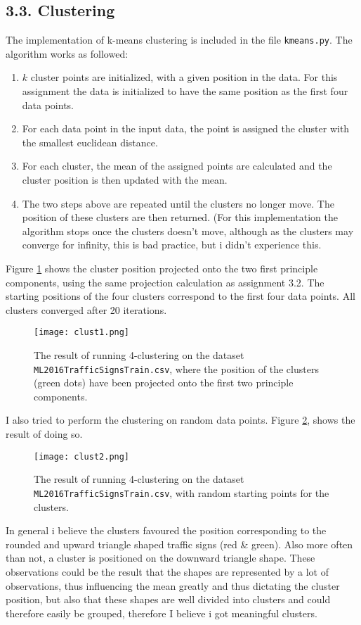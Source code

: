 \documentclass{article}
\begin{document}
\subsection{3.3. Clustering}
The implementation of k-means clustering is included in the file \texttt{kmeans.py}. The algorithm works as followed:
\begin{enumerate}
\item{$k$ cluster points are initialized, with a given position in the data. For this assignment the data is initialized to have the same position as the first four data points.}
\item{For each data point in the input data, the point is assigned the cluster with the smallest euclidean distance.}
\item{For each cluster, the mean of the assigned points are calculated
and the cluster position is then updated with the mean.
}
\item{The two steps above are repeated until the clusters no longer move. The position of these clusters are then returned. (For this implementation the algorithm stops once the clusters doesn't move, although as the clusters may converge for infinity, this is bad practice, but i didn't experience this.}
\end{enumerate}
Figure \ref{fig:clust1} shows the cluster position projected onto the two first principle components, using the same projection calculation as assignment 3.2. The starting positions of the four clusters correspond to the first four data points. All clusters converged after 20 iterations.
\begin{figure}[H]
  \centering
  \texttt{[image: clust1.png]}
  \caption{The result of running 4-clustering on the dataset \texttt{ML2016TrafficSignsTrain.csv}, where the position of the clusters (green dots) have been projected onto the first two principle components.
  }
  \label{fig:clust1}
\end{figure}
I also tried to perform the clustering on random data points. Figure \ref{fig:clust2}, shows the result of doing so.
\begin{figure}[H]
  \centering
  \texttt{[image: clust2.png]}
  \caption{The result of running 4-clustering on the dataset \texttt{ML2016TrafficSignsTrain.csv}, with random starting points for the clusters.
  }
  \label{fig:clust2}
\end{figure}
In general i believe the clusters favoured the position corresponding to the rounded and upward triangle shaped traffic signs (red \& green). Also more often than not, a cluster is positioned on the downward triangle shape.  These observations could be the result that the shapes are represented by a lot of observations, thus influencing the mean greatly and thus dictating the cluster position, but also  that these shapes are well divided into clusters and could therefore easily be grouped, therefore I believe i got meaningful clusters.
\end{document}
